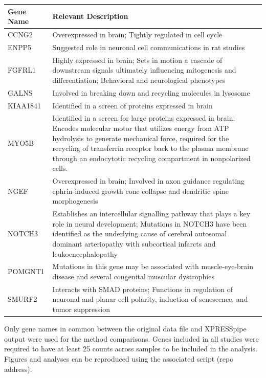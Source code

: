 \documentclass[11pt, a4paper, oneside]{article}
\begin{document}
\begin{tabular}{p{2.5cm}p{15.5cm}}
 \textbf{Gene Name} & \textbf{Relevant Description} \\
 \hline
 CCNG2 & Overexpressed in brain; Tightly regulated in cell cycle \\
 \hline
 ENPP5 & Suggested role in neuronal cell communications in rat studies \\
 \hline
 FGFRL1 & Highly expressed in brain; Sets in motion a cascade of downstream signals ultimately influencing mitogenesis and differentiation; Behavioral and neurological phenotypes \\
 \hline
 GALNS & Involved in breaking down and recycling molecules in lysosome \\
 \hline
 KIAA1841 & Identified in a screen of proteins expressed in brain \\
 \hline
 MYO5B & Identified in a screen for large proteins expressed in brain; Encodes molecular motor that utilizes energy from ATP hydrolysis to generate mechanical force, required for the recycling of transferrin receptor back to the plasma membrane through an endocytotic recycling compartment in nonpolarized cells. \\
 \hline
 NGEF & Overexpressed in brain; Involved in axon guidance regulating ephrin-induced growth cone collapse and dendritic spine morphogenesis \\
 \hline
 NOTCH3 & Establishes an intercellular signalling pathway that plays a key role in neural development; Mutations in NOTCH3 have been identified as the underlying cause of cerebral autosomal dominant arteriopathy with subcortical infarcts and leukoencephalopathy \\
 \hline
 POMGNT1 & Mutations in this gene may be associated with muscle-eye-brain disease and several congenital muscular dystrophies \\
 \hline
 SMURF2 & Interacts with SMAD proteins; Functions in regulation of neuronal and planar cell polarity, induction of senescence, and tumor suppression \\
\end{tabular}
\newline

Only gene names in common between the original data file and XPRESSpipe output were used for the method comparisons. Genes included in all studies were required to have at least 25 counts across samples to be included in the analysis. Figures and analyses can be reproduced using the associated script (repo address).
\end{document}
